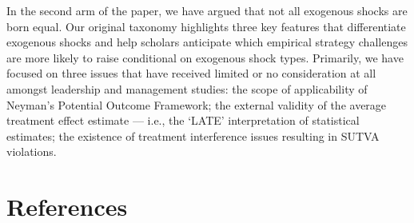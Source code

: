 \documentclass[11pt]{article}
\begin{document}
\begin{refsection}
In the second arm of the paper, we have argued that not all exogenous shocks are born equal. Our original taxonomy highlights three key features that differentiate exogenous shocks and help scholars anticipate which empirical strategy challenges are more likely to raise conditional on exogenous shock types. Primarily, we have focused on three issues that have received limited or no consideration at all amongst leadership and management studies: the scope of applicability of Neyman's Potential Outcome Framework; the external validity of the average treatment effect estimate --- i.e., the `LATE' interpretation of statistical estimates; the existence of treatment interference issues resulting in SUTVA violations.


%
\clearpage
\section*{References}
\printbibliography[heading=none]
\end{refsection}
\end{document}
